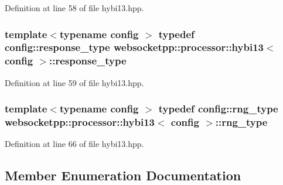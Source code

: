 Definition at line 58 of file hybi13.\+hpp.

\hypertarget{classwebsocketpp_1_1processor_1_1hybi13_a5d918ca9c9aa6c38a145f2ef1d2aa38a}{}
\subsubsection[{response\+\_\+type}]{\setlength{\rightskip}{0pt plus 5cm}template$<$typename config $>$ typedef config\+::response\+\_\+type {\bf websocketpp\+::processor\+::hybi13}$<$ config $>$\+::{\bf response\+\_\+type}}\label{classwebsocketpp_1_1processor_1_1hybi13_a5d918ca9c9aa6c38a145f2ef1d2aa38a}


Definition at line 59 of file hybi13.\+hpp.

\hypertarget{classwebsocketpp_1_1processor_1_1hybi13_ad6e55eeed8ec7329fb71abceb4159a5c}{}
\subsubsection[{rng\+\_\+type}]{\setlength{\rightskip}{0pt plus 5cm}template$<$typename config $>$ typedef config\+::rng\+\_\+type {\bf websocketpp\+::processor\+::hybi13}$<$ config $>$\+::{\bf rng\+\_\+type}}\label{classwebsocketpp_1_1processor_1_1hybi13_ad6e55eeed8ec7329fb71abceb4159a5c}


Definition at line 66 of file hybi13.\+hpp.



\subsection{Member Enumeration Documentation}
\hypertarget{classwebsocketpp_1_1processor_1_1hybi13_a56fee5ffbb0b5c2c0708be2338e0740d}{}
